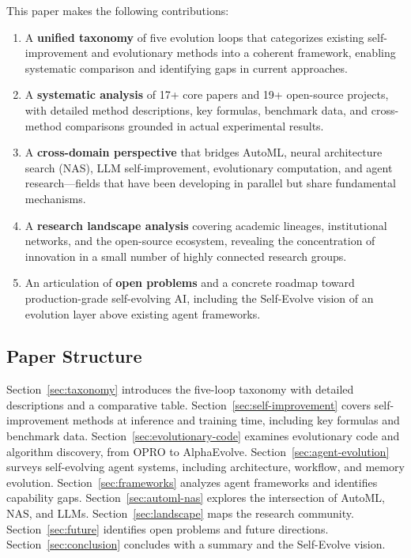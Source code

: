 \documentclass[11pt,a4paper]{article}
\begin{document}
This paper makes the following contributions:
\begin{enumerate}
\item A \textbf{unified taxonomy} of five evolution loops that categorizes existing self-improvement and evolutionary methods into a coherent framework, enabling systematic comparison and identifying gaps in current approaches.
\item A \textbf{systematic analysis} of 17+ core papers and 19+ open-source projects, with detailed method descriptions, key formulas, benchmark data, and cross-method comparisons grounded in actual experimental results.
\item A \textbf{cross-domain perspective} that bridges AutoML, neural architecture search (NAS), LLM self-improvement, evolutionary computation, and agent research---fields that have been developing in parallel but share fundamental mechanisms.
\item A \textbf{research landscape analysis} covering academic lineages, institutional networks, and the open-source ecosystem, revealing the concentration of innovation in a small number of highly connected research groups.
\item An articulation of \textbf{open problems} and a concrete roadmap toward production-grade self-evolving AI, including the Self-Evolve vision of an evolution layer above existing agent frameworks.
\end{enumerate}

\subsection{Paper Structure}

Section~\ref{sec:taxonomy} introduces the five-loop taxonomy with detailed descriptions and a comparative table. Section~\ref{sec:self-improvement} covers self-improvement methods at inference and training time, including key formulas and benchmark data. Section~\ref{sec:evolutionary-code} examines evolutionary code and algorithm discovery, from OPRO to AlphaEvolve. Section~\ref{sec:agent-evolution} surveys self-evolving agent systems, including architecture, workflow, and memory evolution. Section~\ref{sec:frameworks} analyzes agent frameworks and identifies capability gaps. Section~\ref{sec:automl-nas} explores the intersection of AutoML, NAS, and LLMs. Section~\ref{sec:landscape} maps the research community. Section~\ref{sec:future} identifies open problems and future directions. Section~\ref{sec:conclusion} concludes with a summary and the Self-Evolve vision.
\end{document}
